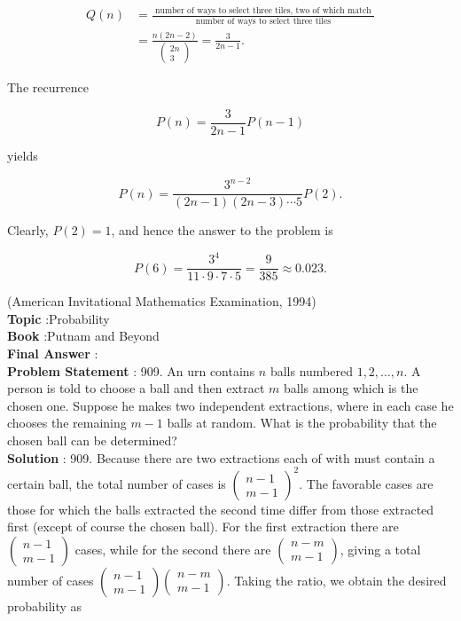 \documentclass[10pt]{article}
\begin{document}
$$
\begin{aligned}
Q(n) &=\frac{\text { number of ways to select three tiles, two of which match }}{\text { number of ways to select three tiles }} \\
&=\frac{n(2 n-2)}{\left(\begin{array}{c}
2 n \\
3
\end{array}\right)}=\frac{3}{2 n-1} .
\end{aligned}
$$

The recurrence

$$
P(n)=\frac{3}{2 n-1} P(n-1)
$$

yields

$$
P(n)=\frac{3^{n-2}}{(2 n-1)(2 n-3) \cdots 5} P(2) .
$$

Clearly, $P(2)=1$, and hence the answer to the problem is

$$
P(6)=\frac{3^{4}}{11 \cdot 9 \cdot 7 \cdot 5}=\frac{9}{385} \approx 0.023 .
$$

(American Invitational Mathematics Examination, 1994)
\\
\textbf{Topic} :Probability\\
\textbf{Book} :Putnam and Beyond\\
\textbf{Final Answer} :\\


\textbf{Problem Statement} :
909. An urn contains $n$ balls numbered $1,2, \ldots, n$. A person is told to choose a ball and then extract $m$ balls among which is the chosen one. Suppose he makes two independent extractions, where in each case he chooses the remaining $m-1$ balls at random. What is the probability that the chosen ball can be determined?
\\
\textbf{Solution} :
909. Because there are two extractions each of with must contain a certain ball, the total number of cases is $\left(\begin{array}{c}n-1 \\ m-1\end{array}\right)^{2}$. The favorable cases are those for which the balls extracted the second time differ from those extracted first (except of course the chosen ball). For the first extraction there are $\left(\begin{array}{c}n-1 \\ m-1\end{array}\right)$ cases, while for the second there are $\left(\begin{array}{c}n-m \\ m-1\end{array}\right)$, giving a total number of cases $\left(\begin{array}{c}n-1 \\ m-1\end{array}\right)\left(\begin{array}{c}n-m \\ m-1\end{array}\right)$. Taking the ratio, we obtain the desired probability as
\end{document}
